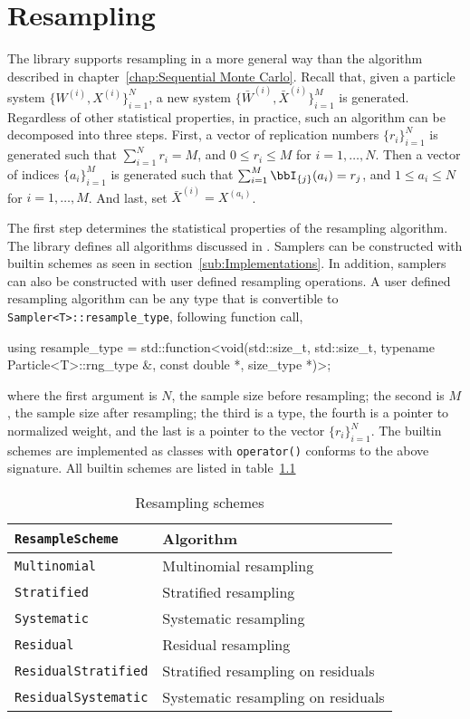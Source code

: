 \chapter{Resampling}
\label{chap:Resampling}

The library supports resampling in a more general way than the algorithm
described in chapter~\ref{chap:Sequential Monte Carlo}. Recall that, given a
particle system $\{W^{(i)},X^{(i)}\}_{i=1}^N$, a new system $\{\bar{W}^{(i)},
\bar{X}^{(i)}\}_{i=1}^M$ is generated. Regardless of other statistical
properties, in practice, such an algorithm can be decomposed into three steps.
First, a vector of replication numbers $\{r_i\}_{i=1}^N$ is generated such that
$\sum_{i=1}^N r_i = M$, and $0 \le r_i \le M$ for $i=1,\dots,N$. Then a vector
of indices $\{a_i\}_{i=1}^M$ is generated such that $\sum_{i=1}^M
\bbI_{\{j\}}(a_i) = r_j$, and $1 \le a_i \le N$ for $i= 1,\dots,M$. And last,
set $\bar{X}^{(i)} = X^{(a_i)}$.

The first step determines the statistical properties of the resampling
algorithm. The library defines all algorithms discussed in
\textcite{Douc:2005wa}. Samplers can be constructed with builtin schemes as
seen in section~\ref{sub:Implementations}. In addition, samplers can also be
constructed with user defined resampling operations. A user defined resampling
algorithm can be any type that is convertible to
\verb|Sampler<T>::resample_type|,
following function call,
\begin{cppcode}
  using resample_type = std::function<void(std::size_t, std::size_t,
      typename Particle<T>::rng_type &, const double *, size_type *)>;
\end{cppcode}
where the first argument is $N$, the sample size before resampling; the second
is $M$, the sample size after resampling; the third is a \cppoo{} \rng type,
the fourth is a pointer to normalized weight, and the last is a pointer to the
vector $\{r_i\}_{i=1}^N$. The builtin schemes are implemented as classes with
\verb|operator()| conforms to the above signature. All builtin schemes are
listed in table~\ref{tab:Resampling schemes}

\begin{table}
  \begin{tabularx}{\textwidth}{lX}
    \toprule
    \verb|ResampleScheme| & Algorithm \\
    \midrule
    \verb|Multinomial|        & Multinomial resampling             \\
    \verb|Stratified|         & Stratified resampling              \\
    \verb|Systematic|         & Systematic resampling              \\
    \verb|Residual|           & Residual resampling                \\
    \verb|ResidualStratified| & Stratified resampling on residuals \\
    \verb|ResidualSystematic| & Systematic resampling on residuals \\
    \bottomrule
  \end{tabularx}
  \caption{Resampling schemes}
  \label{tab:Resampling schemes}
\end{table}

